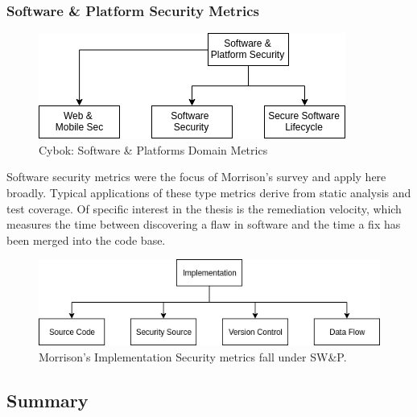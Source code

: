 \subsubsection{Software \& Platform Security Metrics}

\begin{figure}[ht]

\begin{mdframed}
\centering
\includegraphics[width=.55\linewidth]{resource/img/ch_background/cybok_metrics/cybok_sw_platforms.png}
\end{mdframed}
\caption{Cybok: Software \& Platforms Domain Metrics
\label{fig:background:cybok_sw_metrics}}
\end{figure} 

Software security metrics were the focus of Morrison’s survey and apply here broadly. Typical applications of these type metrics derive from static analysis and test coverage. Of specific interest in the thesis is the remediation velocity, which measures the time between discovering a flaw in software and the time a fix has been merged into the code base.


\begin{figure}[ht]
\centering
\includegraphics[width=.85\linewidth]{resource/img/ch_background/cybok_metrics/morrison_implementation.png}
\centering
\caption{Morrison’s Implementation Security metrics fall under SW\&P.
\label{fig:background:morrison_implementation_ad}}
\end{figure} 


\subsection{Summary}

